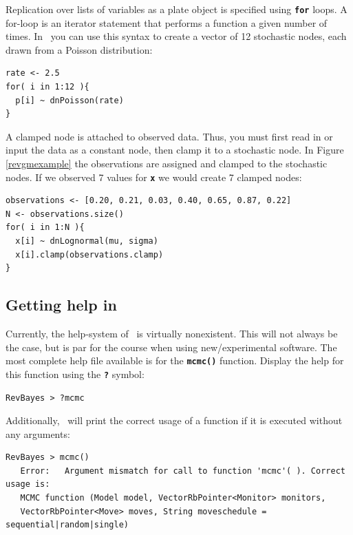 \documentclass[11pt]{article}
\newcommand{\taha}[1]{{\textcolor{red}{[TAH comment: #1]}}} %
\newcommand{\cl}[1]{{\texttt{\textbf{#1}}}}
\begin{document}
Replication over lists of variables as a plate object is specified using \cl{for} loops. 
A for-loop is an iterator statement that performs a function a given number of times. 
In \Rev~you can use this syntax to create a vector of 12 stochastic nodes, each drawn from a Poisson distribution:
{\tt \begin{snugshade*}
\begin{lstlisting}
rate <- 2.5
for( i in 1:12 ){
  p[i] ~ dnPoisson(rate)
}
\end{lstlisting}
\end{snugshade*}}

A clamped node is attached to observed data. 
Thus, you must first read in or input the data as a constant node, then clamp it to a stochastic node. 
In Figure \ref{revgmexample} the observations are assigned and clamped to the stochastic nodes.
If we observed 7 values for \cl{x} we would create 7 clamped nodes:
{\tt \begin{snugshade*}
\begin{lstlisting}
observations <- [0.20, 0.21, 0.03, 0.40, 0.65, 0.87, 0.22]
N <- observations.size()
for( i in 1:N ){
  x[i] ~ dnLognormal(mu, sigma)
  x[i].clamp(observations.clamp)
}
\end{lstlisting}
\end{snugshade*}}



\subsection*{Getting help in \RevBayes}
%
%
%


Currently, the help-system of \RevBayes~is virtually nonexistent. 
This will not always be the case, but is par for the course when using new/experimental software. 
The most complete help file available is for the \cl{mcmc()} function. Display the help for this function using the \cl{?} symbol:
{\tt \begin{snugshade*}
\begin{lstlisting}
RevBayes > ?mcmc
\end{lstlisting}
\end{snugshade*}}

Additionally, \RevBayes~will print the correct usage of a function if it is executed without any arguments:
{\tt \small \begin{snugshade*}
\begin{lstlisting}
RevBayes > mcmc()
   Error:   Argument mismatch for call to function 'mcmc'( ). Correct usage is:
   MCMC function (Model model, VectorRbPointer<Monitor> monitors,
   VectorRbPointer<Move> moves, String moveschedule = sequential|random|single)
\end{lstlisting}
\end{snugshade*}}
\end{document}
